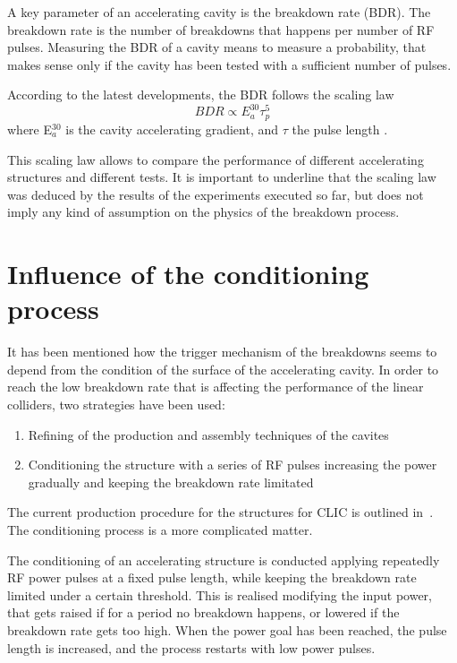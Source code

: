  A key parameter of an accelerating cavity is the breakdown rate (BDR). The breakdown rate is the number of breakdowns that happens per number of RF pulses. Measuring the BDR of a cavity means to measure a probability, that makes sense only if the cavity has been tested with a sufficient number of pulses. 

According to the latest developments, the BDR follows the scaling law
\begin{equation}
BDR \propto E^{30}_a \tau^5_p 
\end{equation}
where E$^{30}_a$ is the cavity accelerating gradient, and $\tau$ the pulse length  \cite{Wuensch:advaces}.

This scaling law allows to compare the performance of different accelerating structures and different tests. It is important to underline that the scaling law was deduced by the results of the experiments executed so far, but does not imply any kind of assumption on the physics of the breakdown process.




\section[Influence of the conditioning process]{Influence of the conditioning process}

It has been mentioned how the trigger mechanism of the breakdowns seems to depend from the condition of the surface of the accelerating cavity. In order to reach the low breakdown rate that is affecting the performance of the linear colliders, two strategies have been used:
\begin{enumerate}
\item Refining of the production and assembly techniques of the cavites
\item Conditioning the structure with a series of RF pulses increasing the power gradually and keeping the breakdown rate limitated
\end{enumerate}
The current production procedure for the structures for CLIC is outlined in~\cite{CLIC:cdr}. The conditioning process is a more complicated matter. 

The conditioning of an accelerating structure is conducted applying repeatedly RF power pulses at a fixed pulse length, while keeping the breakdown rate limited under a certain threshold. This is realised modifying the input power, that gets raised if for a period no breakdown happens, or lowered if the breakdown rate gets too high. When the power goal has been reached, the pulse length is increased, and the process restarts with low power pulses.

